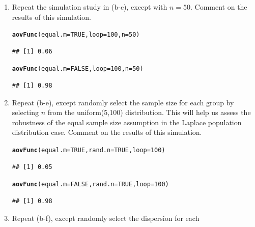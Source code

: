 \documentclass{article}\usepackage[]{graphicx}\usepackage[]{color}
\makeatletter
\newcommand{\hlnum}[1]{\textcolor[rgb]{0.686,0.059,0.569}{#1}}%
\newcommand{\hlstd}[1]{\textcolor[rgb]{0.345,0.345,0.345}{#1}}%
\newcommand{\hlkwc}[1]{\textcolor[rgb]{0.333,0.667,0.333}{#1}}%
\newcommand{\hlkwd}[1]{\textcolor[rgb]{0.737,0.353,0.396}{\textbf{#1}}}%
\newenvironment{kframe}{%
 \def\at@end@of@kframe{}%
 \ifinner\ifhmode%
  \def\at@end@of@kframe{\end{minipage}}%
  \begin{minipage}{\columnwidth}%
 \fi\fi%
 \def\FrameCommand##1{\hskip\@totalleftmargin \hskip-\fboxsep
 \colorbox{shadecolor}{##1}\hskip-\fboxsep
     \hskip-\linewidth \hskip-\@totalleftmargin \hskip\columnwidth}%
 \MakeFramed {\advance\hsize-\width
   \@totalleftmargin\z@ \linewidth\hsize
   \@setminipage}}%
 {\par\unskip\endMakeFramed%
 \at@end@of@kframe}
\newenvironment{knitrout}{}{} %
\makeatother
\begin{document}
\begin{enumerate}
\begin{enumerate}
  \item Repeat the simulation study in (b-c), except with $n=50$.
  Comment on the results of this simulation.
\begin{knitrout}
\color{fgcolor}\begin{kframe}
\begin{alltt}
\hlkwd{aovFunc}\hlstd{(}\hlkwc{equal.m}\hlstd{=}\hlnum{TRUE}\hlstd{,} \hlkwc{loop}\hlstd{=}\hlnum{100}\hlstd{,} \hlkwc{n}\hlstd{=}\hlnum{50}\hlstd{)}
\end{alltt}
\begin{verbatim}
## [1] 0.06
\end{verbatim}
\begin{alltt}
\hlkwd{aovFunc}\hlstd{(}\hlkwc{equal.m}\hlstd{=}\hlnum{FALSE}\hlstd{,} \hlkwc{loop}\hlstd{=}\hlnum{100}\hlstd{,} \hlkwc{n}\hlstd{=}\hlnum{50}\hlstd{)}
\end{alltt}
\begin{verbatim}
## [1] 0.98
\end{verbatim}
\end{kframe}
\end{knitrout}
\item Repeat (b-e), except randomly select the sample size for each 
group by selecting $n$ from the uniform(5,100) distribution. This 
will help us assess the robustness of the equal sample size assumption
in the Laplace population distribution case. Comment on the results of 
this simulation.
\begin{knitrout}
\color{fgcolor}\begin{kframe}
\begin{alltt}
\hlkwd{aovFunc}\hlstd{(}\hlkwc{equal.m}\hlstd{=}\hlnum{TRUE}\hlstd{,} \hlkwc{rand.n}\hlstd{=}\hlnum{TRUE}\hlstd{,} \hlkwc{loop}\hlstd{=}\hlnum{100}\hlstd{)}
\end{alltt}
\begin{verbatim}
## [1] 0.05
\end{verbatim}
\begin{alltt}
\hlkwd{aovFunc}\hlstd{(}\hlkwc{equal.m}\hlstd{=}\hlnum{FALSE}\hlstd{,} \hlkwc{rand.n}\hlstd{=}\hlnum{TRUE}\hlstd{,} \hlkwc{loop}\hlstd{=}\hlnum{100}\hlstd{)}
\end{alltt}
\begin{verbatim}
## [1] 0.98
\end{verbatim}
\end{kframe}
\end{knitrout}
\item Repeat (b-f), except randomly select the dispersion for each 

\end{enumerate}
\end{enumerate}
\end{document}
